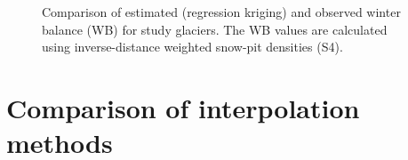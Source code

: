 \documentclass{sfuthesis}
\begin{document}
\begin{figure}[H]
	\caption[Comparison of estimated (regression kriging) and observed winter balance (WB) for study glaciers]{Comparison of estimated (regression kriging) and observed winter balance (WB) for study glaciers. The WB values are calculated using inverse-distance weighted snow-pit densities (S4).}
	\label{fig:R2regressionkrig}
\end{figure}


\section{Comparison of interpolation methods}
\label{sec:compareInterpMethods}
\end{document}
